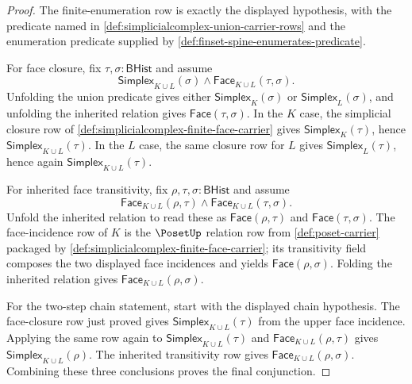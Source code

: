 \begin{proof}
The finite-enumeration row is exactly the displayed hypothesis, with the predicate named in \autoref{def:simplicialcomplex-union-carrier-rows} and the enumeration predicate supplied by \autoref{def:finset-spine-enumerates-predicate}.

For face closure, fix $\tau,\sigma:\mathsf{BHist}$ and assume
$$
\mathsf{Simplex}_{K\cup L}(\sigma)
\land
\mathsf{Face}_{K\cup L}(\tau,\sigma).
$$
Unfolding the union predicate gives either $\mathsf{Simplex}_K(\sigma)$ or $\mathsf{Simplex}_L(\sigma)$, and unfolding the inherited relation gives $\mathsf{Face}(\tau,\sigma)$. In the $K$ case, the simplicial closure row of \autoref{def:simplicialcomplex-finite-face-carrier} gives $\mathsf{Simplex}_K(\tau)$, hence $\mathsf{Simplex}_{K\cup L}(\tau)$. In the $L$ case, the same closure row for $L$ gives $\mathsf{Simplex}_L(\tau)$, hence again $\mathsf{Simplex}_{K\cup L}(\tau)$.

For inherited face transitivity, fix $\rho,\tau,\sigma:\mathsf{BHist}$ and assume
$$
\mathsf{Face}_{K\cup L}(\rho,\tau)
\land
\mathsf{Face}_{K\cup L}(\tau,\sigma).
$$
Unfold the inherited relation to read these as $\mathsf{Face}(\rho,\tau)$ and $\mathsf{Face}(\tau,\sigma)$. The face-incidence row of $K$ is the $\PosetUp$ relation row from \autoref{def:poset-carrier} packaged by \autoref{def:simplicialcomplex-finite-face-carrier}; its transitivity field composes the two displayed face incidences and yields $\mathsf{Face}(\rho,\sigma)$. Folding the inherited relation gives $\mathsf{Face}_{K\cup L}(\rho,\sigma)$.

For the two-step chain statement, start with the displayed chain hypothesis. The face-closure row just proved gives $\mathsf{Simplex}_{K\cup L}(\tau)$ from the upper face incidence. Applying the same row again to $\mathsf{Simplex}_{K\cup L}(\tau)$ and $\mathsf{Face}_{K\cup L}(\rho,\tau)$ gives $\mathsf{Simplex}_{K\cup L}(\rho)$. The inherited transitivity row gives $\mathsf{Face}_{K\cup L}(\rho,\sigma)$. Combining these three conclusions proves the final conjunction.
\end{proof}

